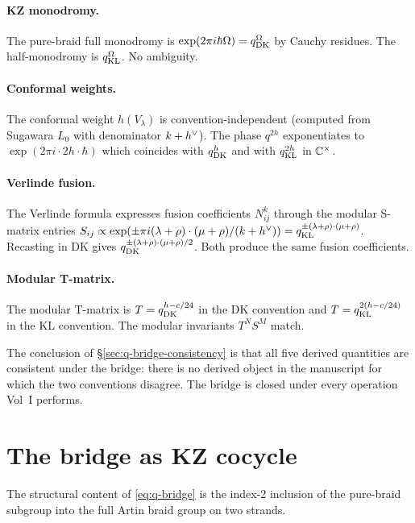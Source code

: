 \paragraph{KZ monodromy.}
The pure-braid full monodromy is $\exp(2\pi i \hbar \Omega) =
q_{\mathrm{DK}}^{\Omega}$ by Cauchy residues. The half-monodromy is
$q_{\mathrm{KL}}^{\Omega}$. No ambiguity.

\paragraph{Conformal weights.}
The conformal weight $h(V_{\lambda})$ is convention-independent
(computed from Sugawara $L_{0}$ with denominator $k + h^{\vee}$). The
phase $q^{2h}$ exponentiates to $\exp(2\pi i \cdot 2 h \cdot
\hbar)$ which coincides with $q_{\mathrm{DK}}^{h}$ and with
$q_{\mathrm{KL}}^{2h}$ in $\mathbb{C}^{\times}$.

\paragraph{Verlinde fusion.}
The Verlinde formula expresses fusion coefficients $N^{k}_{ij}$
through the modular S-matrix entries $S_{ij} \propto \exp(\pm\pi
i (\lambda + \rho) \cdot (\mu + \rho)/(k + h^{\vee})) =
q_{\mathrm{KL}}^{\pm(\lambda + \rho) \cdot (\mu + \rho)}$. Recasting in
DK gives $q_{\mathrm{DK}}^{\pm(\lambda + \rho) \cdot (\mu + \rho)/2}$.
Both produce the same fusion coefficients.

\paragraph{Modular T-matrix.}
The modular T-matrix is $T = q_{\mathrm{DK}}^{h - c/24}$ in the DK
convention and $T = q_{\mathrm{KL}}^{2(h - c/24)}$ in the KL convention.
The modular invariants $T^{N} S^{M}$ match.

The conclusion of \S\ref{sec:q-bridge-consistency} is that all
five derived quantities are consistent under the bridge: there is
no derived object in the manuscript for which the two conventions
disagree. The bridge is closed under every operation Vol~I
performs.

\section{The bridge as KZ cocycle}
\label{sec:q-bridge-cocycle}

The structural content of \eqref{eq:q-bridge} is the index-2
inclusion of the pure-braid subgroup into the full Artin braid
group on two strands.

